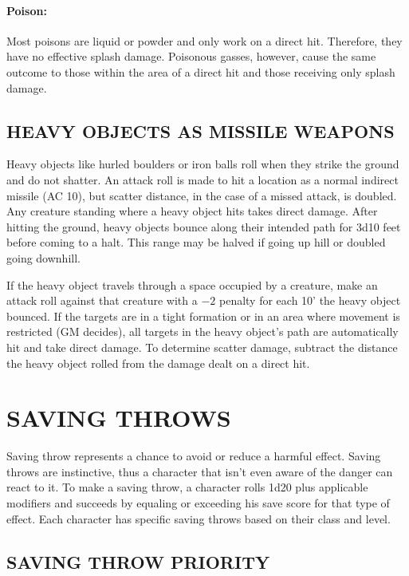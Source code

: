 \begin{multicols}{2}
\paragraph{Poison:} Most poisons are liquid or powder and only work on a direct hit. Therefore, they have no effective splash damage.  Poisonous gasses, however, cause the same outcome to those within the area of a direct hit and those receiving only splash damage.

\subsection{HEAVY OBJECTS AS MISSILE WEAPONS}

Heavy objects like hurled boulders or iron balls roll when they strike the ground and do not shatter.  An attack roll is made to hit a location as a normal indirect missile (AC 10), but scatter distance, in the case of a missed attack, is doubled.  Any creature standing where a heavy object hits takes direct damage.  After hitting the ground, heavy objects bounce along their intended path for 3d10 feet before coming to a halt.  This range may be halved if going up hill or doubled going downhill.  

If the heavy object travels through a space occupied by a creature, make an attack roll against that creature with a $-2$ penalty for each 10' the heavy object bounced.  If the targets are in a tight formation or in an area where movement is restricted (GM decides), all targets in the heavy object's path are automatically hit and take direct damage.  To determine scatter damage, subtract the distance the heavy object rolled from the damage dealt on a direct hit.

\section{SAVING THROWS}

Saving throw represents a chance to avoid or reduce a harmful effect.  Saving throws are instinctive, thus a character that isn't even aware of the danger can react to it.  To make a saving throw, a character rolls 1d20 plus applicable modifiers and succeeds by equaling or exceeding his save score for that type of effect.  Each character has specific saving throws based on their class and level.  

\subsection{SAVING THROW PRIORITY}


\end{multicols}

